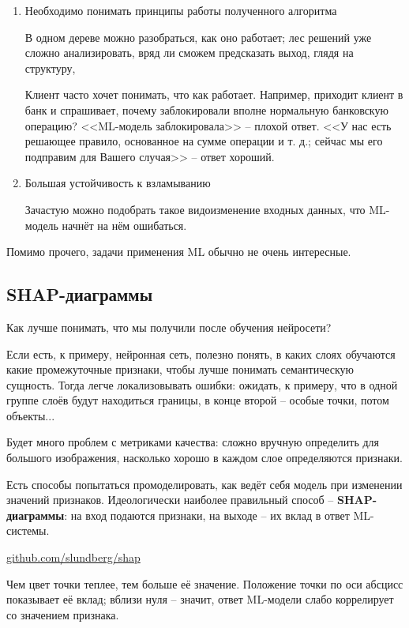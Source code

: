 \documentclass[main.tex]{subfiles}
\begin{document}
\begin{enumerate}[noitemsep]
	\item Необходимо понимать принципы работы полученного алгоритма
	
	В одном дереве можно разобраться, как оно работает; лес решений уже сложно анализировать, вряд ли сможем предсказать выход, глядя на структуру,
	
	Клиент часто хочет понимать, что как работает.
	Например, приходит клиент в банк и спрашивает, почему заблокировали вполне нормальную банковскую операцию?
	<<ML-модель заблокировала>> -- плохой ответ.
	<<У нас есть решающее правило, основанное на сумме операции и т. д.; сейчас мы его подправим для Вашего случая>> -- ответ хороший.
	
	\item Большая устойчивость к взламыванию
	
	Зачастую можно подобрать такое видоизменение входных данных, что ML-модель начнёт на нём ошибаться.
\end{enumerate}

Помимо прочего, задачи применения ML обычно не очень интересные.

\subsection{SHAP-диаграммы}

Как лучше понимать, что мы получили после обучения нейросети?

Если есть, к примеру, нейронная сеть, полезно понять, в каких слоях обучаются какие промежуточные признаки, чтобы лучше понимать семантическую сущность.
Тогда легче локализовывать ошибки: ожидать, к примеру, что в одной группе слоёв будут находиться границы, в конце второй -- особые точки, потом объекты...


Будет много проблем с метриками качества: сложно вручную определить для большого изображения, насколько хорошо в каждом слое определяются признаки.

Есть способы попытаться промоделировать, как ведёт себя модель при изменении значений признаков.
Идеологически наиболее правильный способ -- \textbf{SHAP-диаграммы}: на вход подаются признаки, на выходе -- их вклад в ответ ML-системы.

\href{https://github.com/slundberg/shap}{github.com/slundberg/shap}

Чем цвет точки теплее, тем больше её значение.
Положение точки по оси абсцисс показывает её вклад; вблизи нуля -- значит, ответ ML-модели слабо коррелирует со значением признака.
\end{document}
